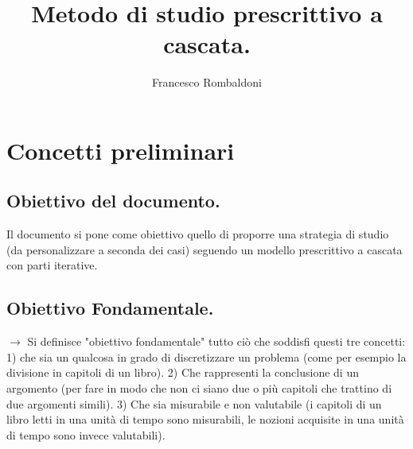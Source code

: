 \documentclass[11pt,a4paper]{article}
\begin{document}
\title{Metodo di studio prescrittivo a cascata.}
\author{Francesco Rombaldoni}
\date{}
\maketitle
\newpage

\section{Concetti preliminari}
 \subsection{Obiettivo del documento. }
Il documento si pone come obiettivo quello di proporre una strategia di studio (da personalizzare a seconda dei casi) seguendo un modello prescrittivo a cascata con parti iterative.\\

\subsection{Obiettivo Fondamentale.}
$\rightarrow$ Si definisce "obiettivo fondamentale" tutto ciò che soddisfi questi tre concetti: 1)  che sia un qualcosa in grado di discretizzare un problema (come per esempio la divisione in capitoli di un libro). 2) Che rappresenti la conclusione di un argomento (per fare in modo che non ci siano due o più capitoli che trattino di due argomenti simili). 3) Che sia misurabile e non valutabile (i capitoli di un libro letti in una unità di tempo sono misurabili, le nozioni acquisite in una unità di tempo sono invece valutabili).\\
\end{document}
